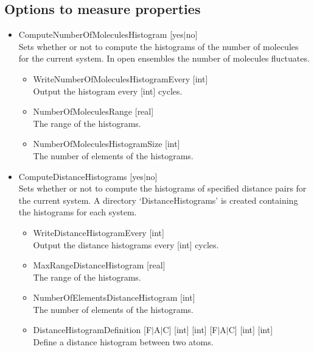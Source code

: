 \subsection*{Options to measure properties}
\begin{itemize}

\item{ComputeNumberOfMoleculesHistogram [yes$|$no]}\\
Sets whether or not to compute the histograms of the number of molecules for the current system.
In open ensembles the number of molecules fluctuates.
\begin{itemize}
\item{WriteNumberOfMoleculesHistogramEvery [int]}\\
Output the histogram every [int] cycles.
\item{NumberOfMoleculesRange [real]}\\
The range of the histograms.
\item{NumberOfMoleculesHistogramSize [int]}\\
The number of elements of the histograms.
\end{itemize}

\item{ComputeDistanceHistograms [yes$|$no]}\\
Sets whether or not to compute the histograms of specified distance pairs for the current system.
A directory `DistanceHistograms' is created containing the histograms for each system.
\begin{itemize}
\item{WriteDistanceHistogramEvery [int]}\\
Output the distance histograms every [int] cycles.
\item{MaxRangeDistanceHistogram [real]}\\
The range of the histograms.
\item{NumberOfElementsDistanceHistogram [int]}\\
The number of elements of the histograms.
\item{DistanceHistogramDefinition [F$|$A$|$C] [int] [int] [F$|$A$|$C] [int] [int]}\\
Define a distance histogram between two atoms.
\end{itemize}


\end{itemize}
